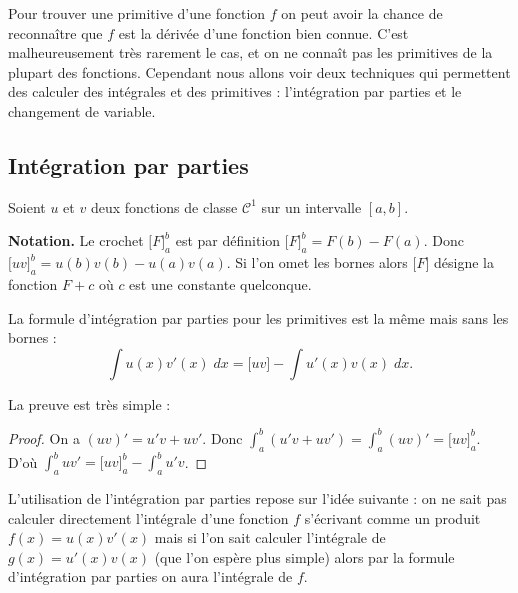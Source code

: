 \documentclass[class=report,crop=false]{standalone}
\begin{document}
Pour trouver une primitive d'une fonction $f$ on peut avoir la chance de reconnaître
que $f$ est la dérivée d'une fonction bien connue. C'est malheureusement très rarement le cas,
et on ne connaît pas les primitives de la plupart des fonctions. Cependant nous allons
voir deux techniques qui permettent des calculer des intégrales et des primitives :
l'intégration par parties et le changement de variable.


\subsection{Intégration par parties}
\begin{theoreme}
Soient $u$ et $v$ deux fonctions de classe $\mathcal{C}^1$ sur un intervalle $[a,b]$.
\end{theoreme}

\textbf{Notation.} Le crochet $\big[F\big]_a^b$ est par définition $\big[F\big]_a^b=F(b)-F(a)$.
Donc $\big[uv\big]_a^b = u(b)v(b)-u(a)v(a)$.
Si l'on omet les bornes alors $\big[F\big]$ désigne la fonction $F+c$ où $c$ est une constante quelconque.

La formule d'intégration par parties pour les primitives est la même mais sans les bornes :
$$\int u(x)v'(x)\;dx= \big[uv\big] - \int u'(x)v(x)\;dx.$$


La preuve est très simple :
\begin{proof}
On a $(uv)'=u'v+uv'$. Donc $\int_a^b (u'v+uv')=\int_a^b (uv)'=\big[uv\big]_a^b$.
D'où $\int_a^b uv'= \big[uv\big]_a^b - \int_a^b u'v$.
\end{proof}

L'utilisation de l'intégration par parties repose sur l'idée suivante :
on ne sait pas calculer directement l'intégrale d'une fonction $f$ s'écrivant
comme un produit $f(x)=u(x)v'(x)$ mais si l'on sait calculer l'intégrale
de $g(x)=u'(x)v(x)$ (que l'on espère plus simple) alors par la formule d'intégration par parties
on aura l'intégrale de $f$.
\end{document}
